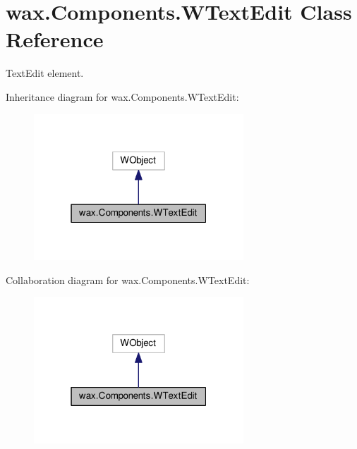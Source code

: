 \hypertarget{classwax_1_1Components_1_1WTextEdit}{}\section{wax.\+Components.\+W\+Text\+Edit Class Reference}
\label{classwax_1_1Components_1_1WTextEdit}


Text\+Edit element.  




Inheritance diagram for wax.\+Components.\+W\+Text\+Edit\+:
\nopagebreak
\begin{figure}[H]
\begin{center}
\leavevmode
\includegraphics[width=223pt]{classwax_1_1Components_1_1WTextEdit__inherit__graph}
\end{center}
\end{figure}


Collaboration diagram for wax.\+Components.\+W\+Text\+Edit\+:
\nopagebreak
\begin{figure}[H]
\begin{center}
\leavevmode
\includegraphics[width=223pt]{classwax_1_1Components_1_1WTextEdit__coll__graph}
\end{center}
\end{figure}
